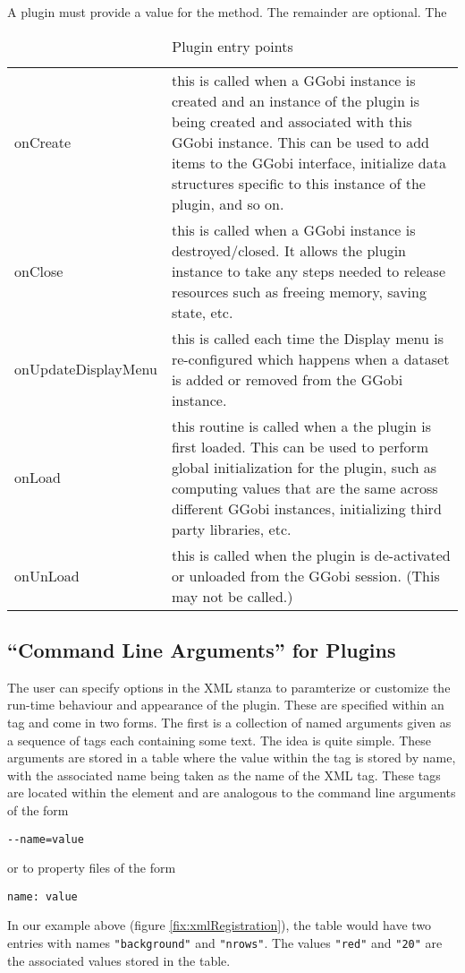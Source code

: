 \documentclass{article}
\begin{document}
A plugin must provide a value for the  method.
The remainder are optional.
The 
\begin{table}[htbp]
  \begin{center}
    \leavevmode
    \begin{tabular}{lp{4in}}
onCreate & 
this is called when a GGobi instance is created
and an instance of the plugin is being created
and associated with this GGobi instance.
This can be used to add items to the GGobi interface,
initialize data structures specific to this instance
of the plugin, and so on. \\
onClose & this is called when a GGobi instance
is destroyed/closed. It allows the plugin instance
to take any steps needed to release resources
such as freeing memory, saving state, etc. \\
onUpdateDisplayMenu & 
this is called each time the Display menu
is re-configured which happens when a
dataset is added or removed from the GGobi instance. 
\\
onLoad & this routine is called when a the plugin
is first loaded. This can be used
to perform global initialization 
for the plugin, such as computing values
that are the same across different GGobi
instances, initializing third party libraries, etc.
\\
onUnLoad & this is called when the plugin is de-activated
or unloaded from the GGobi session.
(This may not be called.)
    \end{tabular}
    \caption{Plugin entry points}
    \label{tab:entryPoints}
  \end{center}
\end{table}

\subsection{``Command Line Arguments'' for Plugins}
The user can specify options in the XML stanza to paramterize or
customize the run-time behaviour and appearance of the plugin.  These
are specified within an  tag and come in two forms.
The first is a collection of named arguments given as a sequence of
tags each containing some text.  The idea is quite simple. These
arguments are stored in a table where the value within the tag is
stored by name, with the associated name being taken as the name of
the XML tag.  These tags are located within the  element
and are analogous to the command line arguments of the form
\begin{verbatim}
--name=value
\end{verbatim}
or to property files of the form
\begin{verbatim}
name: value
\end{verbatim}
In our example above (figure \ref{fix:xmlRegistration}), the table
would have two entries with names \texttt{"background"} and
\texttt{"nrows"}.  The values \texttt{"red"} and \texttt{"20"} are
the associated values stored in the table.
\end{document}
